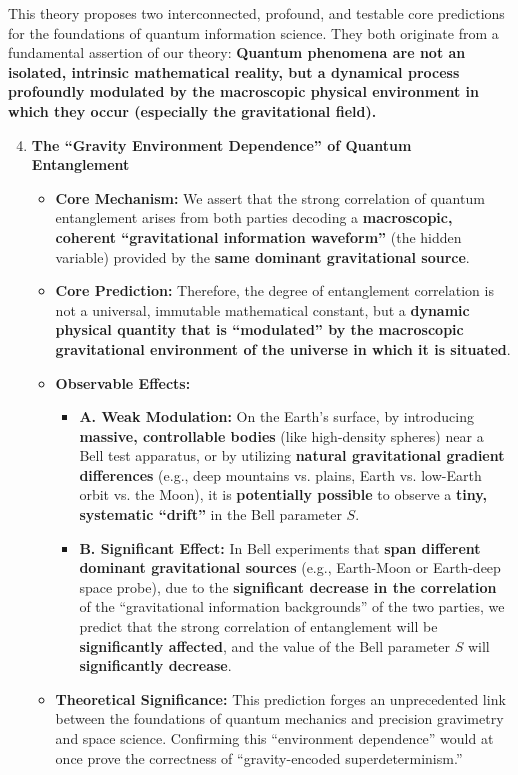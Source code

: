 \documentclass[11pt, a4paper]{article}
\begin{document}
This theory proposes two interconnected, profound, and testable core predictions for the foundations of quantum information science. They both originate from a fundamental assertion of our theory: \textbf{Quantum phenomena are not an isolated, intrinsic mathematical reality, but a dynamical process profoundly modulated by the macroscopic physical environment in which they occur (especially the gravitational field).}

\begin{enumerate}
    \setcounter{enumi}{3} %
    \item \textbf{The ``Gravity Environment Dependence'' of Quantum Entanglement} \cite{Bell1964}

    \begin{itemize}
        \item \textbf{Core Mechanism:} We assert that the strong correlation of quantum entanglement arises from both parties decoding a \textbf{macroscopic, coherent ``gravitational information waveform''} (the hidden variable) provided by the \textbf{same dominant gravitational source}.
        \item \textbf{Core Prediction:} Therefore, the degree of entanglement correlation is not a universal, immutable mathematical constant, but a \textbf{dynamic physical quantity that is ``modulated'' by the macroscopic gravitational environment of the universe in which it is situated}.
        \item \textbf{Observable Effects:}
        \begin{itemize}
            \item \textbf{A. Weak Modulation:} On the Earth's surface, by introducing \textbf{massive, controllable bodies} (like high-density spheres) near a Bell test apparatus, or by utilizing \textbf{natural gravitational gradient differences} (e.g., deep mountains vs. plains, Earth vs. low-Earth orbit vs. the Moon), it is \textbf{potentially possible} to observe a \textbf{tiny, systematic ``drift''} in the Bell parameter $S$.
            \item \textbf{B. Significant Effect:} In Bell experiments that \textbf{span different dominant gravitational sources} (e.g., Earth-Moon or Earth-deep space probe), due to the \textbf{significant decrease in the correlation} of the ``gravitational information backgrounds'' of the two parties, we predict that the strong correlation of entanglement will be \textbf{significantly affected}, and the value of the Bell parameter $S$ will \textbf{significantly decrease}.
        \end{itemize}
        \item \textbf{Theoretical Significance:} This prediction forges an unprecedented link between the foundations of quantum mechanics and precision gravimetry and space science. Confirming this ``environment dependence'' would at once prove the correctness of ``gravity-encoded superdeterminism.''
    \end{itemize}


\end{enumerate}
\end{document}

